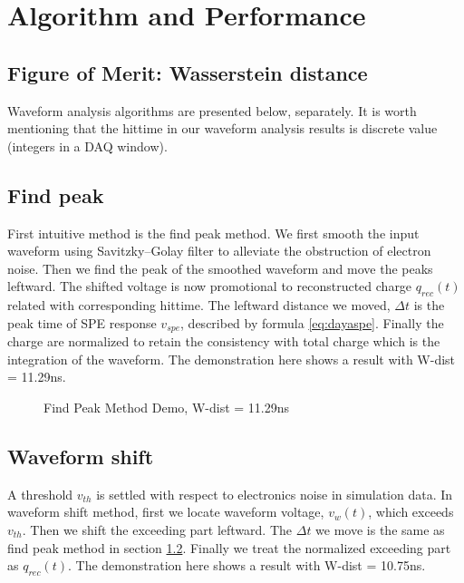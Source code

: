 \section{Algorithm and Performance} %
\label{sec:algorithm}

\subsection{Figure of Merit: Wasserstein distance}



Waveform analysis algorithms are presented below, separately. It is worth mentioning that the hittime in our waveform analysis results is discrete value (integers in a DAQ window). 

\subsection{Find peak}
\label{sec:findpeak}

First intuitive method is the find peak method. We first smooth the input waveform using Savitzky–Golay filter to alleviate the obstruction of electron noise. Then we find the peak of the smoothed waveform and move the peaks leftward. The shifted voltage is now promotional to reconstructed charge $q_{rec}(t)$ related with corresponding hittime. The leftward distance we moved, $\Delta t$ is the peak time of SPE response $v_{spe}$, described by formula \eqref{eq:dayaspe}. Finally the charge are normalized to retain the consistency with total charge which is the integration of the waveform. The demonstration here shows a result with W-dist = 11.29ns. 

\begin{figure}[H]
    \centering
    \scalebox{0.4}{}
    \caption{Find Peak Method Demo, W-dist = 11.29ns}
\end{figure}

\subsection{Waveform shift}

A threshold $v_{th}$ is settled with respect to electronics noise in simulation data. In waveform shift method, first we locate waveform voltage, $v_{w}(t)$, which exceeds $v_{th}$. Then we shift the exceeding part leftward. The $\Delta t$ we move is the same as find peak method in section \ref{sec:findpeak}. Finally we treat the normalized exceeding part as $q_{rec}(t)$. The demonstration here shows a result with W-dist = 10.75ns. 

